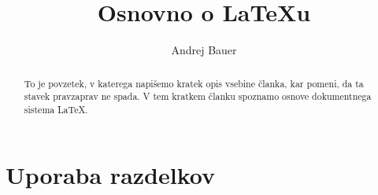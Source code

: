 \documentclass[a4paper]{article}
\begin{document}

\title{Osnovno o {\LaTeX}u}
\author{Andrej Bauer}



\maketitle

%
%

\begin{abstract}
  To je povzetek, v katerega napišemo kratek opis vsebine članka, kar pomeni, da ta stavek
  pravzaprav ne spada. V tem kratkem članku spoznamo osnove dokumentnega sistema {\LaTeX}.
\end{abstract}


\section{Uporaba razdelkov}

\end{document}
